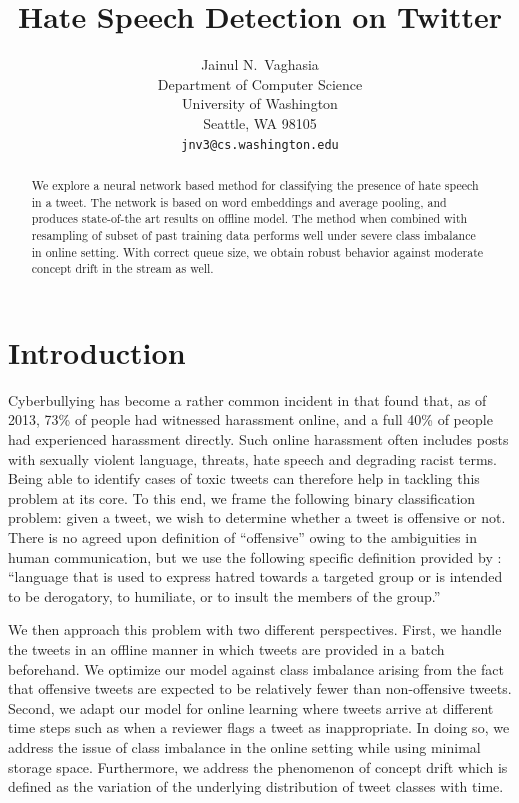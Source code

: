 \documentclass{article}
\title{Hate Speech Detection on Twitter}
\author{
    Jainul N.~Vaghasia\\
    Department of Computer Science\\
    University of Washington\\
    Seattle, WA 98105 \\
    \texttt{jnv3@cs.washington.edu}
  }
\begin{document}
  
  \maketitle

  \begin{abstract}
    We explore a neural network based method for classifying the presence of hate speech in a tweet.
    The network is based on word embeddings and average pooling, and produces state-of-the art results on
    offline model. The method when combined with resampling of subset of past training data performs well
    under severe class imbalance in online setting. With correct queue size, we obtain robust behavior against moderate concept drift in the stream as well.
  \end{abstract}
    
  \section{Introduction}
  Cyberbullying has become a rather common incident in that \cite{pew}
  found that, as of 2013, 73\% of people had witnessed harassment online, and a full
  40\% of people had experienced harassment directly. Such online harassment
  often includes posts with sexually violent language, threats, hate speech and degrading racist
  terms. Being able to identify cases of toxic tweets can therefore help in tackling this problem
  at its core. To this end, we frame the following binary classification problem:
  given a tweet, we wish to determine whether a tweet is offensive or not. There is no
  agreed upon definition of ``offensive'' owing to the ambiguities in human communication, but we
  use the following specific definition provided by \cite{hateoffensive}: ``language that is used to express hatred towards
  a targeted group or is intended to be derogatory, to humiliate, or to insult the members of the group.''
  
  We then approach this problem with two different perspectives. First, we handle the tweets in
  an offline manner in which tweets are provided
  in a batch beforehand. We optimize our model against class imbalance arising from the fact that offensive tweets are expected to be relatively fewer than non-offensive
  tweets. Second, we adapt our model for online learning where
  tweets arrive at different time steps such as when a reviewer flags a tweet as inappropriate. In doing so, we address the issue of class imbalance in the online setting while using minimal storage space.
   Furthermore, we address the phenomenon of concept drift which is defined as the variation of the underlying distribution of tweet classes with time.
\end{document}
